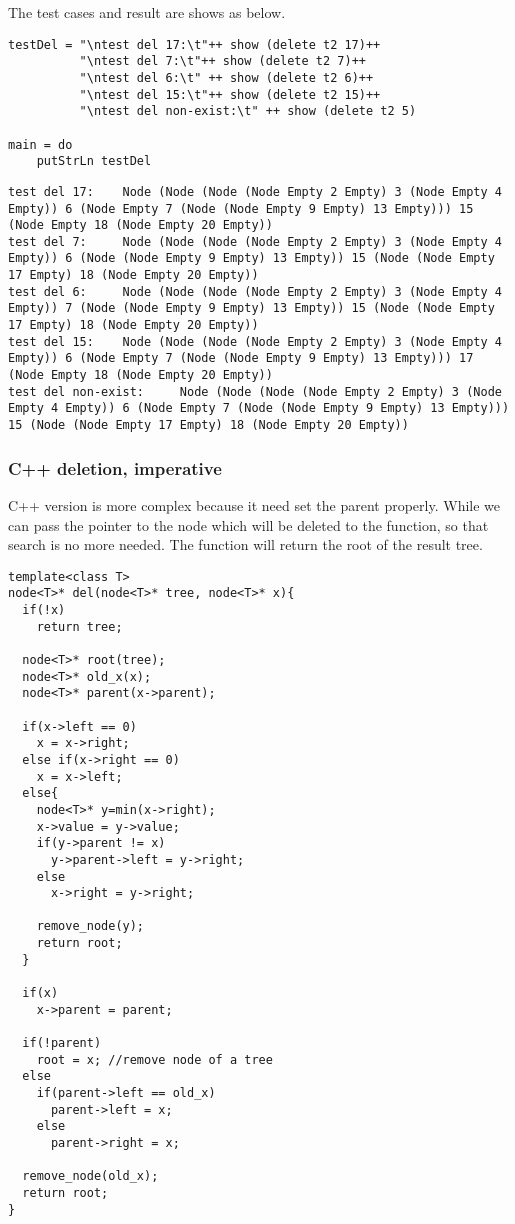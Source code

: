 \documentclass{article}
\begin{document}
The test cases and result are shows as below.

\begin{lstlisting}
testDel = "\ntest del 17:\t"++ show (delete t2 17)++
          "\ntest del 7:\t"++ show (delete t2 7)++
          "\ntest del 6:\t" ++ show (delete t2 6)++
          "\ntest del 15:\t"++ show (delete t2 15)++
          "\ntest del non-exist:\t" ++ show (delete t2 5)

main = do
    putStrLn testDel
\end{lstlisting}

\begin{verbatim}
test del 17:    Node (Node (Node (Node Empty 2 Empty) 3 (Node Empty 4 
Empty)) 6 (Node Empty 7 (Node (Node Empty 9 Empty) 13 Empty))) 15 
(Node Empty 18 (Node Empty 20 Empty))
test del 7:     Node (Node (Node (Node Empty 2 Empty) 3 (Node Empty 4 
Empty)) 6 (Node (Node Empty 9 Empty) 13 Empty)) 15 (Node (Node Empty 
17 Empty) 18 (Node Empty 20 Empty))
test del 6:     Node (Node (Node (Node Empty 2 Empty) 3 (Node Empty 4 
Empty)) 7 (Node (Node Empty 9 Empty) 13 Empty)) 15 (Node (Node Empty 
17 Empty) 18 (Node Empty 20 Empty))
test del 15:    Node (Node (Node (Node Empty 2 Empty) 3 (Node Empty 4 
Empty)) 6 (Node Empty 7 (Node (Node Empty 9 Empty) 13 Empty))) 17 
(Node Empty 18 (Node Empty 20 Empty))
test del non-exist:     Node (Node (Node (Node Empty 2 Empty) 3 (Node 
Empty 4 Empty)) 6 (Node Empty 7 (Node (Node Empty 9 Empty) 13 Empty))) 
15 (Node (Node Empty 17 Empty) 18 (Node Empty 20 Empty))
\end{verbatim}

\subsubsection*{C++ deletion, imperative}

C++ version is more complex because it need set the parent properly.
While we can pass the pointer to the node which will be deleted to the function,
so that search is no more needed. The function will return the root
of the result tree.

\lstset{language=C++}
\begin{lstlisting}
template<class T>
node<T>* del(node<T>* tree, node<T>* x){
  if(!x)
    return tree;

  node<T>* root(tree);
  node<T>* old_x(x);
  node<T>* parent(x->parent);

  if(x->left == 0)
    x = x->right;
  else if(x->right == 0)
    x = x->left;
  else{
    node<T>* y=min(x->right);
    x->value = y->value;
    if(y->parent != x)
      y->parent->left = y->right;
    else
      x->right = y->right;

    remove_node(y);
    return root;
  }

  if(x)
    x->parent = parent;

  if(!parent)
    root = x; //remove node of a tree
  else
    if(parent->left == old_x)
      parent->left = x;
    else
      parent->right = x;

  remove_node(old_x);
  return root;
}
\end{lstlisting}
\end{document}
